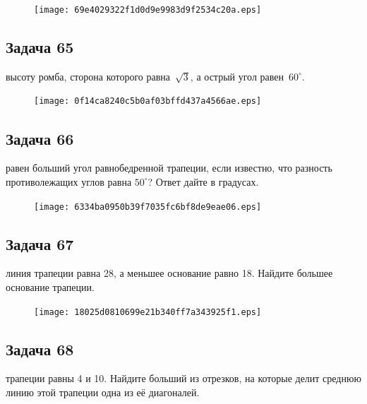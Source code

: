 \documentclass[a4paper,10pt]{article} %
\begin{document}
\begin{spacing}{1.0}
{\vspace{1.5cm}

\begin{figure}{\texttt{[image: 69e4029322f1d0d9e9983d9f2534c20a.eps]}}\end{figure}
\subsection*{Задача 65}
 высоту ромба, сторона которого равна~$\sqrt{3}$, а острый угол равен~$60^\circ$.

\vspace{1.5cm}

\begin{figure}{\texttt{[image: 0f14ca8240c5b0af03bffd437a4566ae.eps]}}\end{figure}
\subsection*{Задача 66}
 равен больший угол равнобедренной трапеции, если известно, что разность противолежащих углов равна $50^\circ$? Ответ дайте в градусах.

\vspace{1.5cm}

\begin{figure}{\texttt{[image: 6334ba0950b39f7035fc6bf8de9eae06.eps]}}\end{figure}
\subsection*{Задача 67}
 линия трапеции равна 28, а меньшее основание равно 18. Найдите большее основание трапеции.

\vspace{1.5cm}

\begin{figure}{\texttt{[image: 18025d0810699e21b340ff7a343925f1.eps]}}\end{figure}

\subsection*{Задача 68}
 трапеции равны 4 и 10. Найдите больший из отрезков, на которые делит среднюю линию этой трапеции одна из её диагоналей.

\vspace{1.5cm}

}
\end{spacing}
\end{document}
